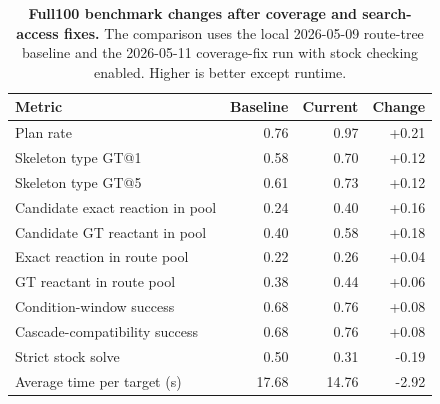 \begin{table}[t]
\caption{\textbf{Full100 benchmark changes after coverage and search-access fixes.}
The comparison uses the local 2026-05-09 route-tree baseline and the 2026-05-11 coverage-fix run with stock checking enabled. Higher is better except runtime.}
\label{tab:full100}
\centering
\begin{tabular}{lrrr}
\toprule
Metric & Baseline & Current & Change \\
\midrule
Plan rate & 0.76 & 0.97 & +0.21 \\
Skeleton type GT@1 & 0.58 & 0.70 & +0.12 \\
Skeleton type GT@5 & 0.61 & 0.73 & +0.12 \\
Candidate exact reaction in pool & 0.24 & 0.40 & +0.16 \\
Candidate GT reactant in pool & 0.40 & 0.58 & +0.18 \\
Exact reaction in route pool & 0.22 & 0.26 & +0.04 \\
GT reactant in route pool & 0.38 & 0.44 & +0.06 \\
Condition-window success & 0.68 & 0.76 & +0.08 \\
Cascade-compatibility success & 0.68 & 0.76 & +0.08 \\
Strict stock solve & 0.50 & 0.31 & -0.19 \\
Average time per target (s) & 17.68 & 14.76 & -2.92 \\
\bottomrule
\end{tabular}
\end{table}
